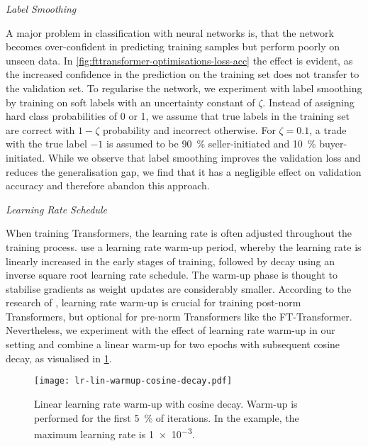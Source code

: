 \emph{Label Smoothing}

A major problem in classification with neural networks is, that the network becomes over-confident in predicting training samples but perform poorly on unseen data. In \cref{fig:fttransformer-optimisations-loss-acc} the effect is evident, as the increased confidence in the prediction on the training set does not transfer to the validation set. To regularise the network, we experiment with label smoothing \autocite[][2823]{szegedyRethinkingInceptionArchitecture2016} by training on soft labels with an uncertainty constant of $\zeta$. Instead of assigning hard class probabilities of 0 or 1, we assume that true labels in the training set are correct with $1-\zeta$ probability and incorrect otherwise. For $\zeta=\num{0.1}$, a trade with the true label $-1$ is assumed to be \SI{90}{\percent} seller-initiated and \SI{10}{\percent} buyer-initiated. While we observe that label smoothing improves the validation loss and reduces the generalisation gap, we find that it has a negligible effect on validation accuracy and therefore abandon this approach.

\emph{Learning Rate Schedule}

When training Transformers, the learning rate is often adjusted throughout the training process. \textcite[][7]{vaswaniAttentionAllYou2017} use a learning rate warm-up period, whereby the learning rate is linearly increased in the early stages of training, followed by decay using an inverse square root learning rate schedule. The warm-up phase is thought to stabilise gradients as weight updates are considerably smaller. According to the research of \textcite[][3--4]{xiongLayerNormalizationTransformer2020}, learning rate warm-up is crucial for training post-norm Transformers, but optional for pre-norm Transformers like the FT-Transformer. Nevertheless, we experiment with the effect of learning rate warm-up in our setting and combine a linear warm-up for two epochs with subsequent cosine decay, as visualised in \cref{fig:lr-lin-warmup-cosine-decay}.

\begin{figure}[!ht]
    \centering
    \texttt{[image: lr-lin-warmup-cosine-decay.pdf]}
    \caption[Linear Learning Rate Warm-Up With Cosine Decay]{Linear learning rate warm-up with cosine decay. Warm-up is performed for the first \SI{5}{\percent} of iterations. In the example, the maximum learning rate is \num{1e-3}.}
    \label{fig:lr-lin-warmup-cosine-decay}
\end{figure}

